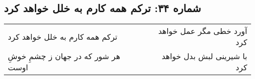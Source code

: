 \begin{center}
\section*{شماره ۳۴: ترکم همه کارم به خلل خواهد کرد}
\label{sec:034}
\begin{longtable}{l p{0.5cm} r}
ترکم همه کارم به خلل خواهد کرد
&&
آورد خطی مگر عمل خواهد کرد
\\
هر شور که در جهان ز چشمِ خوشِ اوست
&&
با شیرینی لبش بدل خواهد کرد
\\
\end{longtable}
\end{center}
